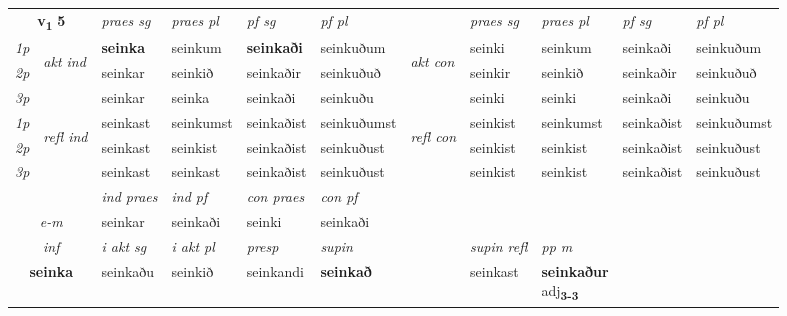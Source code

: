 \noindent
\begin{tabular}{lllllllllll} \toprule
\multicolumn{2}{c}{\textbf{v{\textsubscript{1}}} \Large{\textbf{5}}}  &  \textit{praes sg}  & \textit{praes pl}  &\textit{ pf sg} & \textit{pf pl} &  &  \textit{praes sg}  & \textit{praes pl}  & \textit{pf sg} & \textit{pf pl } \\*
	\cmidrule{3-6} \cmidrule{8-11}
 {\textit{1p}} & \multirow{3}{*}{\begin{turn}{90}\textit{akt ind}\end{turn}} & \textbf{seinka} & seinkum & \textbf{seinkaði} & seinkuðum & \multirow{3}{*}{\begin{turn}{90}\textit{akt con}\end{turn}} &seinki & seinkum & seinkaði & seinkuðum\\*
 {\textit{2p}} &  &  seinkar  & seinkið & seinkaðir & seinkuðuð & & seinkir & seinkið & seinkaðir & seinkuðuð \\*
{\textit{3p}} &  & seinkar & seinka & seinkaði & seinkuðu & & seinki & seinki& seinkaði & seinkuðu \\*
\cmidrule{3-6} \cmidrule{8-11}
 {\textit{1p}} & \multirow{3}{*}{\begin{turn}{90}\textit{refl ind}\end{turn}}  & seinkast & seinkumst & seinkaðist & seinkuðumst & \multirow{3}{*}{\begin{turn}{90}\textit{refl con}\end{turn}}  &seinkist & seinkumst & seinkaðist & seinkuðumst \\*
 {\textit{2p}} &  & seinkast & seinkist & seinkaðist & seinkuðust & &seinkist & seinkist & seinkaðist & seinkuðust \\*
 {\textit{3p}}  & & seinkast & seinkast & seinkaðist & seinkuðust & & seinkist & seinkist& seinkaðist & seinkuðust \\*
\cmidrule{3-6} \cmidrule{8-11}

   & &  \textit{ind praes} & \textit{ind pf} & \textit{con praes} & \textit{con pf} \\*
\multicolumn{2}{c}{ \textit{e-m} } & seinkar & seinkaði & seinki & seinkaði \\*

\cmidrule{3-9}
   \multicolumn{2}{c}{\textit{inf}}  & \textit{i akt sg} & \textit{i akt pl}   & \textit{presp} & \textit{supin} && \textit{supin refl} & \textit{pp m} \\*
  \multicolumn{2}{c}{\textbf{seinka}} & seinkaðu  & seinkið   & seinkandi &  \textbf{seinkað} && seinkast & \specialcell{\textbf{seinkaður} \\ adj\textbf{\textsubscript{3-3}}} \\*
\end{tabular}

